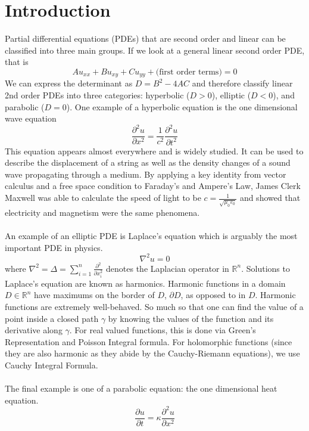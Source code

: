 \documentclass{report}
\theoremstyle{definition}
\theoremstyle{remark}
\newcommand{\R}{\mathbb{R}}
\newcommand{\pd}[2]{\frac{\partial #1}{\partial#2}}
\newcommand{\pdt}[2]{\frac{\partial^2 #1}{\partial#2^2}}
\begin{document}
\section{Introduction}
Partial differential equations (PDEs) that are second order and linear can be classified into three main groups. If we look at a general linear second order PDE, that is 
\begin{equation*}
    Au_{xx}+Bu_{xy}+Cu_{yy}+(\text{first order terms)} = 0
\end{equation*}
We can express the determinant as $D=B^2-4AC$ and therefore classify linear 2nd order PDEs into three categories: hyperbolic ($D>0$), elliptic ($D<0$), and parabolic ($D=0$). One example of a hyperbolic equation is the one dimensional wave equation 
\begin{equation*}
    \pdt{u}{x}=\frac{1}{c^2}\pdt{u}{t}
\end{equation*}
This equation appears almost everywhere and is widely studied. It can be used to describe the displacement of a string as well as the density changes of a sound wave propagating through a medium. By applying a key identity from vector calculus and a free space condition to Faraday's and Ampere's Law, James Clerk Maxwell was able to calculate the speed of light to be $c=\frac{1}{\sqrt{\mu_0\varepsilon_0}}$ and showed that electricity and magnetism were the same phenomena. \\\\
An example of an elliptic PDE is Laplace's equation which is arguably the most important PDE in physics. 
\begin{equation*}
    \nabla ^2u=0
\end{equation*}
where $\nabla^2=\Delta=\sum^n_{i=1}\pdt{}{x_i}$ denotes the Laplacian operator in $\R^n$. Solutions to Laplace's equation are known as harmonics. Harmonic functions in a domain $D\in\R^n$ have maximums on the border of $D$, $\partial D$, as opposed to in $D$. Harmonic functions are extremely well-behaved. So much so that one can find the value of a point inside a closed path $\gamma$ by knowing the values of the function and its derivative along $\gamma$. For real valued functions, this is done via Green's Representation and Poisson Integral formula. For holomorphic functions (since they are also harmonic as they abide by the Cauchy-Riemann equations), we use Cauchy Integral Formula. \\\\
The final example is one of a parabolic equation: the one dimensional heat equation. 
\begin{equation*}
    \pd{u}{t}=\kappa \pdt{u}{x}
\end{equation*}
\end{document}
